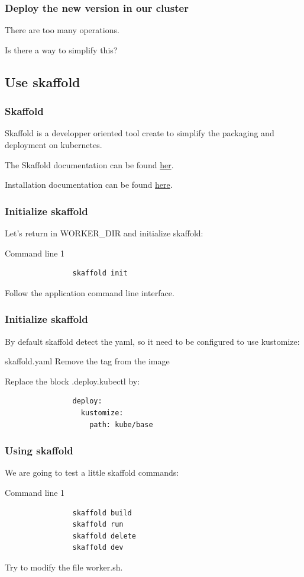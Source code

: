 	\begin{frame}
		\frametitle{Deploy the new version in our cluster}
		
		There are too many operations.
		
		\bigskip
		Is there a way to simplify this?
	\end{frame}
	
\subsection{Use skaffold}	
	
	\begin{frame}
		\frametitle{Skaffold}
		
		Skaffold is a developper oriented tool create to simplify the packaging and deployment on kubernetes.
		
		\medskip
		The Skaffold documentation can be found \href{https://github.com/GoogleContainerTools/skaffold}{her}.
		
		\medskip
		Installation documentation can be found \href{https://skaffold.dev/docs/getting-started}{here}.
	\end{frame}
	
	\begin{frame}[fragile]
		\frametitle{Initialize skaffold}
		
		Let's return in WORKER\_DIR and initialize skaffold:
		\begin{block}{Command line 1}
			\begin{verbatim}
				skaffold init
			\end{verbatim}
			Follow the application command line interface.
		\end{block}
	\end{frame}
	
	\begin{frame}[fragile]
		\frametitle{Initialize skaffold}

		By default skaffold detect the yaml, so it need to be configured to use kustomize:
		\begin{block}{skaffold.yaml}
			Remove the tag from the image
			
			\medskip
			Replace the block .deploy.kubectl by:
			\begin{verbatim}
				deploy:
				  kustomize:
				    path: kube/base			
			\end{verbatim}						
		\end{block}
	\end{frame}
	
	\begin{frame}[fragile]
		\frametitle{Using skaffold}
		
		We are going to test a little skaffold commands:
		\begin{block}{Command line 1}
			\begin{verbatim}
				skaffold build
				skaffold run
				skaffold delete
				skaffold dev
			\end{verbatim}					
		\end{block}
		
		Try to modify the file worker.sh.
	
	\end{frame}
	
